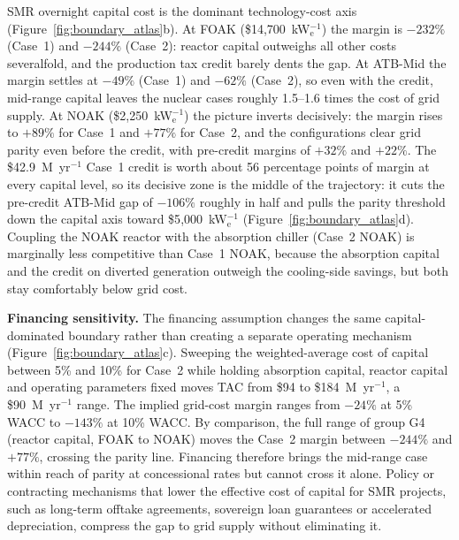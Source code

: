 \documentclass[sn-vancouver,Numbered]{sn-jnl}%
\newcommand{\runinhead}[1]{\par\smallskip\noindent\textbf{#1.}\quad}
\begin{document}
SMR overnight capital cost is the dominant technology-cost axis (Figure~\ref{fig:boundary_atlas}b). At FOAK (\$14{,}700~kW$_\mathrm{e}^{-1}$) the margin is $-232\%$ (Case~1) and $-244\%$ (Case~2): reactor capital outweighs all other costs severalfold, and the production tax credit barely dents the gap. At ATB-Mid the margin settles at $-49\%$ (Case~1) and $-62\%$ (Case~2), so even with the credit, mid-range capital leaves the nuclear cases roughly 1.5--1.6 times the cost of grid supply. At NOAK (\$2{,}250~kW$_\mathrm{e}^{-1}$) the picture inverts decisively: the margin rises to $+89\%$ for Case~1 and $+77\%$ for Case~2, and the configurations clear grid parity even before the credit, with pre-credit margins of $+32\%$ and $+22\%$. The \$42.9~M~yr$^{-1}$ Case~1 credit is worth about 56 percentage points of margin at every capital level, so its decisive zone is the middle of the trajectory: it cuts the pre-credit ATB-Mid gap of $-106\%$ roughly in half and pulls the parity threshold down the capital axis toward \$5{,}000~kW$_\mathrm{e}^{-1}$ (Figure~\ref{fig:boundary_atlas}d). Coupling the NOAK reactor with the absorption chiller (Case~2 NOAK) is marginally less competitive than Case~1 NOAK, because the absorption capital and the credit on diverted generation outweigh the cooling-side savings, but both stay comfortably below grid cost.

\runinhead{Financing sensitivity}
\label{sec:results:wacc}
The financing assumption changes the same capital-dominated boundary rather than creating a separate operating mechanism (Figure~\ref{fig:boundary_atlas}c). Sweeping the weighted-average cost of capital between 5\% and 10\% for Case~2 while holding absorption capital, reactor capital and operating parameters fixed moves TAC from \$94 to \$184~M~yr$^{-1}$, a \$90~M~yr$^{-1}$ range. The implied grid-cost margin ranges from $-24\%$ at 5\% WACC to $-143\%$ at 10\% WACC. By comparison, the full range of group G4 (reactor capital, FOAK to NOAK) moves the Case~2 margin between $-244\%$ and $+77\%$, crossing the parity line. Financing therefore brings the mid-range case within reach of parity at concessional rates but cannot cross it alone. Policy or contracting mechanisms that lower the effective cost of capital for SMR projects, such as long-term offtake agreements, sovereign loan guarantees or accelerated depreciation, compress the gap to grid supply without eliminating it.
\end{document}
